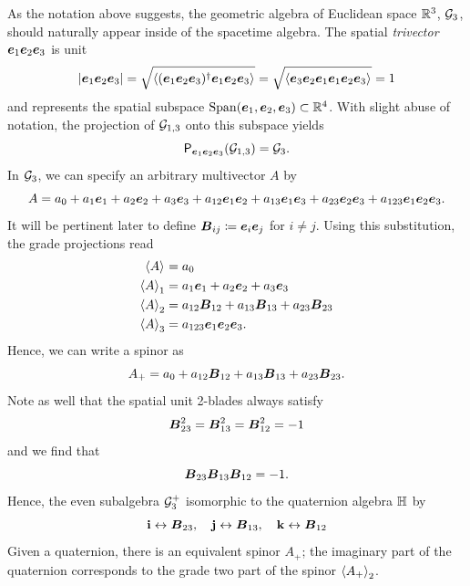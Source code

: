\documentclass{article}
\begin{document}
\begin{example}
As the notation above suggests, the geometric algebra of Euclidean space $\R^3$, $\G_3$, should naturally appear inside of the spacetime algebra. The spatial \emph{trivector} $\blade{e}_1 \blade{e}_2 \blade{e}_3$ is unit
\begin{equation}
|\blade{e}_1 \blade{e}_2 \blade{e}_3| = \sqrt{\proj{}{(\blade{e}_1 \blade{e}_2 \blade{e}_3)^\dagger \blade{e}_1 \blade{e}_2 \blade{e}_3}} = \sqrt{\proj{}{\blade{e}_3 \blade{e}_2 \blade{e}_1 \blade{e}_1 \blade{e}_2 \blade{e}_3}}=1
\end{equation}
and represents the spatial subspace $\mathrm{Span}(\blade{e}_1, \blade{e}_2, \blade{e}_3) \subset \R^4$. With slight abuse of notation, the projection of $\G_{1,3}$ onto this subspace yields
\begin{equation}
\projection_{\blade{e}_1 \blade{e}_2  \blade{e}_3}(\G_{1,3}) = \G_3.
\end{equation}
In $\G_3$, we can specify an arbitrary multivector $A$ by
\begin{equation}
A= a_0 + a_1 \blade{e}_1 + a_2 \blade{e}_2 + a_3 \blade{e}_3 + a_{12} \blade{e}_1\blade{e}_2 + a_{13} \blade{e}_1\blade{e}_3 + a_{23} \blade{e}_2\blade{e}_3 + a_{123} \blade{e}_1 \blade{e}_2 \blade{e}_3.
\end{equation}
It will be pertinent later to define $\bivector_{ij}\coloneqq \blade{e}_i\blade{e}_j$ for $i\neq j$. Using this substitution, the grade projections read
\begin{subequations}
\begin{align}
\proj{}{A}&=a_0\\
\proj{1}{A}&=a_1 \blade{e}_1 + a_2 \blade{e}_2 + a_3 \blade{e}_3\\
\proj{2}{A}&=a_{12} \blade{B}_{12} + a_{13} \blade{B}_{13} + a_{23} \blade{B}_{23}\\
\proj{3}{A}&= a_{123} \blade{e}_1  \blade{e}_2 \blade{e}_3.
\end{align}
\end{subequations}
Hence, we can write a spinor as
\begin{equation}
A_+ = a_0 + a_{12} \blade{B}_{12} + a_{13} \blade{B}_{13} + a_{23}\blade{B}_{23}.
\end{equation}
Note as well that the spatial unit 2-blades always satisfy
\begin{align}
\blade{B}_{23}^2 = \blade{B}_{13}^2 = \blade{B}_{12}^2 = -1
\end{align}
and we find that
\begin{equation}
\blade{B}_{23}\blade{B}_{13}\blade{B}_{12} = -1.
\end{equation}
Hence, the even subalgebra $\G_3^+$ isomorphic to the quaternion algebra $\quat$ by
\begin{equation}
\mathbf{i} \leftrightarrow \blade{B}_{23}, \quad \mathbf{j} \leftrightarrow \blade{B}_{13}, \quad \mathbf{k} \leftrightarrow \blade{B}_{12}
\end{equation}
Given a quaternion, there is an equivalent spinor $A_+$; the imaginary part of the quaternion corresponds to the grade two part of the spinor $\proj{2}{A_+}$.


\end{example}
\end{document}
